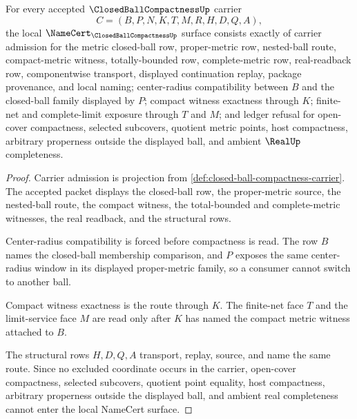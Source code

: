 \begin{theorem}
\label{thm:closed-ball-compactness-namecert-obligations}
For every accepted $\ClosedBallCompactnessUp$ carrier
$$
C=(B,P,N,K,T,M,R,H,D,Q,A),
$$
the local $\NameCert_{\ClosedBallCompactnessUp}$ surface consists exactly of carrier admission for the metric closed-ball row, proper-metric row, nested-ball route, compact-metric witness, totally-bounded row, complete-metric row, real-readback row, componentwise transport, displayed continuation replay, package provenance, and local naming; center-radius compatibility between $B$ and the closed-ball family displayed by $P$; compact witness exactness through $K$; finite-net and complete-limit exposure through $T$ and $M$; and ledger refusal for open-cover compactness, selected subcovers, quotient metric points, host compactness, arbitrary properness outside the displayed ball, and ambient $\RealUp$ completeness.
\end{theorem}
\begin{proof}
Carrier admission is projection from \autoref{def:closed-ball-compactness-carrier}. The accepted packet displays the closed-ball row, the proper-metric source, the nested-ball route, the compact witness, the total-bounded and complete-metric witnesses, the real readback, and the structural rows.

Center-radius compatibility is forced before compactness is read. The row $B$ names the closed-ball membership comparison, and $P$ exposes the same center-radius window in its displayed proper-metric family, so a consumer cannot switch to another ball.

Compact witness exactness is the route through $K$. The finite-net face $T$ and the limit-service face $M$ are read only after $K$ has named the compact metric witness attached to $B$.

The structural rows $H,D,Q,A$ transport, replay, source, and name the same route. Since no excluded coordinate occurs in the carrier, open-cover compactness, selected subcovers, quotient point equality, host compactness, arbitrary properness outside the displayed ball, and ambient real completeness cannot enter the local NameCert surface.
\end{proof}

